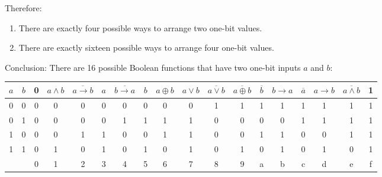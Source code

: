 \documentclass[10pt]{article}
\begin{document}
Therefore:

\begin{enumerate}
\item There are exactly four possible ways to arrange two one-bit values.
\item There are exactly sixteen possible ways to arrange four one-bit values. 
\end{enumerate}

Conclusion: There are 16 possible Boolean functions that have two one-bit inputs $a$ and $b$:

\begin{center}
\begin{tabular}{|cc|cccccccccccccccc|}
$a$ & $b$ & 
	0 &
	$a\land b$ &
	$\overline{a\rightarrow b}$ &
	$a$ &
	$\overline{b\rightarrow a}$ &
	$b$ &
	$a\oplus b$ &
	$a\lor b$ &
	$\overline{a\lor b}$ &
	$\overline{a\oplus b}$ &
	$\overline{b}$ &
	$b\rightarrow a$ &
	$\overline{a}$ &
	$a\rightarrow b$ &
	$\overline{a\land b}$ &
	1 \\
\hline
0 & 0 & 0 & 0 & 0 & 0 & 0 & 0 & 0 & 0 & 1 & 1 & 1 & 1 & 1 & 1 & 1 & 1 \\
0 & 1 & 0 & 0 & 0 & 0 & 1 & 1 & 1 & 1 & 0 & 0 & 0 & 0 & 1 & 1 & 1 & 1 \\
1 & 0 & 0 & 0 & 1 & 1 & 0 & 0 & 1 & 1 & 0 & 0 & 1 & 1 & 0 & 0 & 1 & 1 \\
1 & 1 & 0 & 1 & 0 & 1 & 0 & 1 & 0 & 1 & 0 & 1 & 0 & 1 & 0 & 1 & 0 & 1 \\
\hline
  &   & 0 & 1 & 2 & 3 & 4 & 5 & 6 & 7 & 8 & 9 & a & b & c & d & e & f \\
\hline
\end{tabular}
\end{center}



%
\end{document}
